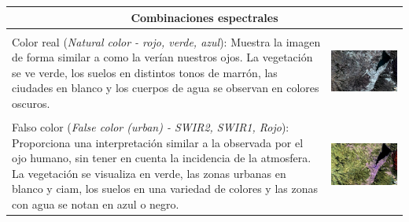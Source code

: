 \documentclass[a4paper,12pt]{book}
\begin{document}
\pagebreak
\hspace{0pt}
\vfill
\begin{table}[H]
    \begin{tabular}{m{} c}
        \toprule
        \multicolumn{2}{c}{Combinaciones espectrales}\\
        \midrule\\
        Color real (\emph{Natural color - rojo, verde, azul}): Muestra la imagen de forma similar a como la verían nuestros ojos. La vegetación se ve verde, los suelos en distintos tonos de marrón, las ciudades en blanco y los cuerpos de agua se observan en colores oscuros. &
        \begin{minipage}{.4\textwidth} \includegraphics[width=\linewidth]{4-3-2.jpeg}
        \end{minipage}\\
        &\\
        Falso color (\emph{False color (urban) - SWIR2, SWIR1, Rojo}): Proporciona una interpretación similar a la observada por el ojo humano, sin tener en cuenta la incidencia de la atmosfera. La vegetación se visualiza en verde, las zonas urbanas en blanco y ciam, los suelos en una variedad de colores y las zonas con agua se notan en azul o negro. &
        \begin{minipage}{.4\textwidth} \includegraphics[width=\linewidth]{12-11-4.jpeg}

\end{minipage}
\end{tabular}
\end{table}
\end{document}
